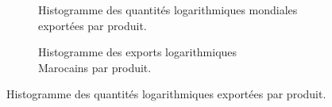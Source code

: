 			\begin{figure}[H]

						\begin{subfigure}{.5\textwidth}
								\centering
								\caption{Histogramme des quantités logarithmiques mondiales exportées par produit.}
								\label{fig:}
						\end{subfigure}
						\begin{subfigure}{.5\textwidth}
												\centering
												\caption{Histogramme des exports logarithmiques\\Marocains par produit.}
												\label{fig:}
						\end{subfigure}
						\caption{Histogramme des quantités logarithmiques exportées par produit.}
						\label{fig:HistProd}
					\end{figure}
